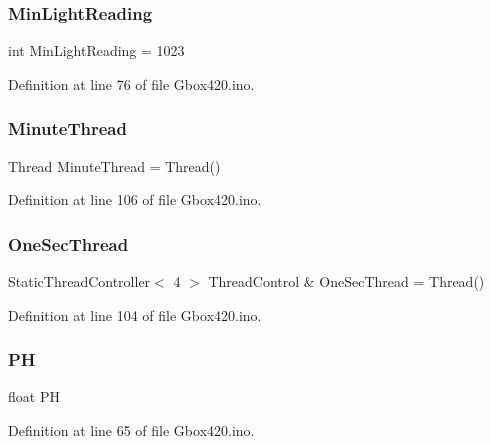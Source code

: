\subsubsection{\texorpdfstring{MinLightReading}{MinLightReading}}
{\footnotesize\ttfamily int Min\+Light\+Reading = 1023}



Definition at line 76 of file Gbox420.\+ino.

\mbox{\label{_gbox420_8ino_a2ddf18e39c01b0be11987f5625da3a48}} 
\subsubsection{\texorpdfstring{MinuteThread}{MinuteThread}}
{\footnotesize\ttfamily Thread Minute\+Thread = Thread()}



Definition at line 106 of file Gbox420.\+ino.

\mbox{\label{_gbox420_8ino_a1254144f7fb7ab5a6e4610e1ba94a2b9}} 
\subsubsection{\texorpdfstring{OneSecThread}{OneSecThread}}
{\footnotesize\ttfamily Static\+Thread\+Controller$<$ 4 $>$ Thread\+Control \& One\+Sec\+Thread = Thread()}



Definition at line 104 of file Gbox420.\+ino.

\mbox{\label{_gbox420_8ino_a24c17fffcda727c63b14ab48a1b63144}} 
\subsubsection{\texorpdfstring{PH}{PH}}
{\footnotesize\ttfamily float PH}



Definition at line 65 of file Gbox420.\+ino.

\mbox{\label{_gbox420_8ino_aabe418038a73729e6f7246a45dcfa2cd}} 
